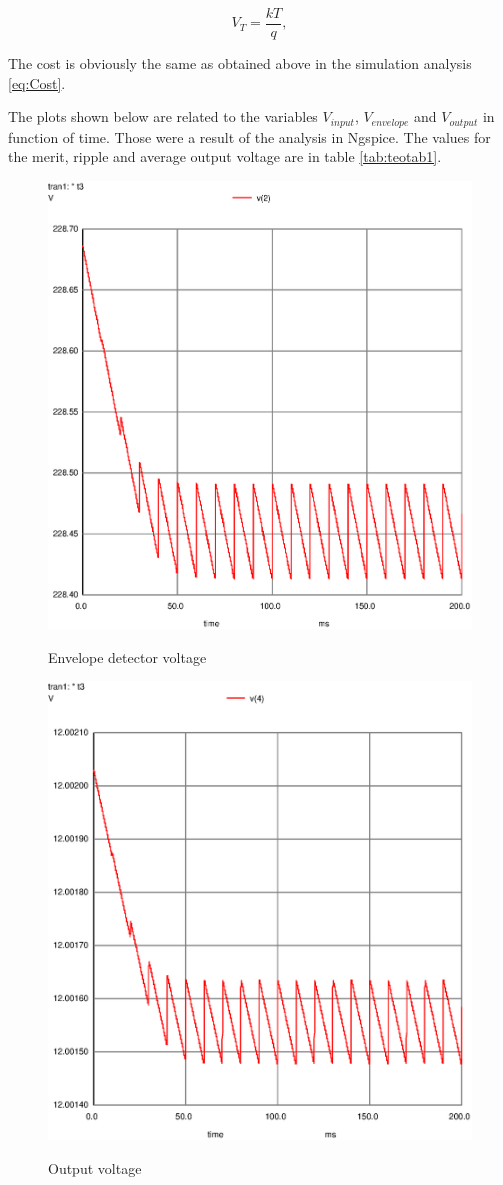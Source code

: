 \begin{equation}
    V_{T} = \frac{kT}{q},
    \label{eq:Ac3}
\end{equation}

The cost is obviously the same as obtained above in the simulation analysis \ref{eq:Cost}.

The plots shown below are related to the variables $V_{input}$, $V_{envelope}$ and $V_{output}$ in function of time. Those were a result of the analysis in Ngspice. The values for the merit, ripple and average output voltage are in table \ref{tab:teotab1}.

\begin{figure}[!ht] \centering
\caption{Envelope detector voltage}
\includegraphics[width=0.6\linewidth]{venv.eps} %
\label{fig:gteo1}
\end{figure}
\newpage

\begin{figure}[!ht] \centering
\caption{Output voltage}
\includegraphics[width=0.6\linewidth]{vout.eps} %
\label{fig:gteo2}
\end{figure}
\newpage

